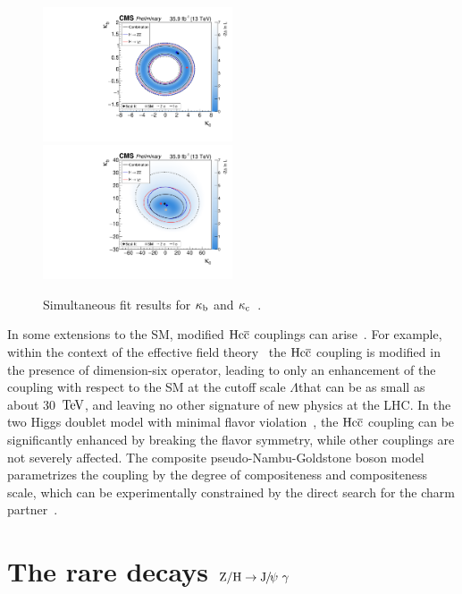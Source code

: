 \begin{figure}[!ht]
\begin{center}
\includegraphics[width=0.5\textwidth]{Fig/CMS-PAS-HIG-17-028_Figure_006-a}~
\includegraphics[width=0.5\textwidth]{Fig/CMS-PAS-HIG-17-028_Figure_006-b}\\
\caption{Simultaneous fit results for $\kappa_{\mathrm{b}}$ and $\kappa_{\mathrm{c}}$~\cite{CMS-PAS-HIG-17-028}. \label{fig:HiggsPt_KappaC_CMS2016}}
\end{center}
\end{figure}

In some extensions to the SM, modified $\mathrm{H} \mathrm{c}\overline{\mathrm{c}}$ couplings can arise~\cite{Delaunay:2013pja}. 
For example, within the context of the effective field theory~\cite{Buchmuller:1985jz,Weinberg:1980wa,Contino:2013kra} the $\mathrm{H}\mathrm{c}\overline{\mathrm{c}}$ coupling is modified in the presence of dimension-six operator, leading to only an enhancement of the coupling with respect to the SM at the cutoff scale $\Lambda$that can be as small as about 30 $\,\text{Te\hspace{-.08em}V}$, and leaving no other signature of new physics at the LHC.
In the two Higgs doublet model with minimal flavor violation~\cite{Trott:2010iz,Jung:2010ik}, the $\mathrm{H} \mathrm{c}\overline{\mathrm{c}}$ coupling can be significantly enhanced by breaking the flavor symmetry, while other couplings are not severely affected. The composite pseudo-Nambu-Goldstone boson model~\cite{Giudice:2007fh} parametrizes the coupling by the degree of compositeness and compositeness scale, which can be experimentally constrained by the direct search for the charm partner~\cite{Delaunay:2013pwa}.

\section{The rare decays $\mathrm{Z}/\mathrm{H}\to{\mathrm{J}\hspace{-.08em}/\hspace{-.14em}\psi}\ \gamma$}
